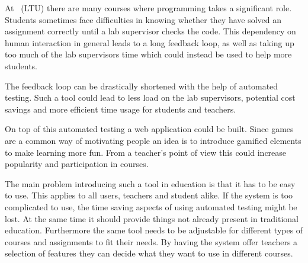 At \LTU\ (LTU) there are many courses where programming takes a significant role. Students sometimes face difficulties in knowing whether they have solved an assignment correctly until a lab supervisor checks the code. This dependency on human interaction in general leads to a long feedback loop, as well as taking up too much of the lab supervisors time which could instead be used to help more students. 

The feedback loop can be drastically shortened with the help of automated testing. Such a tool could lead to less load on the lab supervisors, potential cost savings and more efficient time usage for students and teachers.

On top of this automated testing a web application could be built. Since games are a common way of motivating people an idea is to introduce gamified elements to make learning more fun. From a teacher's point of view this could increase popularity and participation in courses.

The main problem introducing such a tool in education is that it has to be easy to use. This applies to all users, teachers and student alike. If the system is too complicated to use, the time saving aspects of using automated testing might be lost. At the same time it should provide things not already present in traditional education. Furthermore the same tool needs to be adjustable for different types of courses and assignments to fit their needs. By having the system offer teachers a selection of features they can decide what they want to use in different courses.
